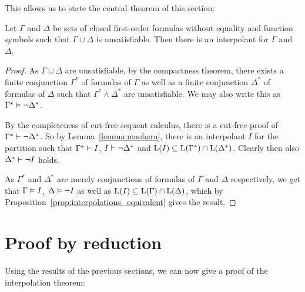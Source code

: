 This allows us to state the central theorem of this section:
\begin{thm}
	\label{thm:prop_interpol}
	Let $\Gamma$ and $\Delta$ be sets of closed first-order formulas without equality and function symbols such that $\Gamma \cup \Delta$ is unsatisfiable. Then there is an interpolant for $\Gamma$ and~$\Delta$.
\end{thm}
\begin{proof}
	As $\Gamma \cup \Delta$ are unsatisfiable, by the compactness theorem, there exists a finite conjunction $\Gamma^*$ of formulas of $\Gamma$ as well as a finite conjunction $\Delta^*$ of formulas of $\Delta$ such that $\Gamma^* \land \Delta^*$ are unsatisfiable.
	We may also write this as $\Gamma^* \vDash \lnot \Delta^*$.

	By the completeness of cut-free sequent calculus, there is a cut-free proof of $\Gamma^* \vdash \lnot \Delta^*$.
	So by Lemma~\ref{lemma:maehara}, there is an interpolant $I$ for the partition \parti{\Gamma^*}{}{}{\lnot \Delta^*}
	such that $\Gamma^* \vdash I$, $I \vdash \lnot \Delta^*$ and $\operatorname{L}(I) \subseteq \operatorname{L}(\Gamma^*) \cap \operatorname{L}(\Delta^*)$.
	Clearly then also $\Delta^* \vdash \lnot I$ holds.

	As $\Gamma^*$ and $\Delta^*$ are merely conjunctions of formulas of $\Gamma$ and $\Delta$ respectively, we get that
	$\Gamma \vDash I$, $\Delta \vDash \lnot I$ as well as
	$\operatorname{L}(I) \subseteq \operatorname{L}(\Gamma) \cap \operatorname{L}(\Delta)$, which by Proposition~\ref{prop:interpolations_equivalent} gives the result.
\end{proof}



		\section{Proof by reduction}

		Using the results of the previous sections, we can now give a proof of the interpolation theorem:

